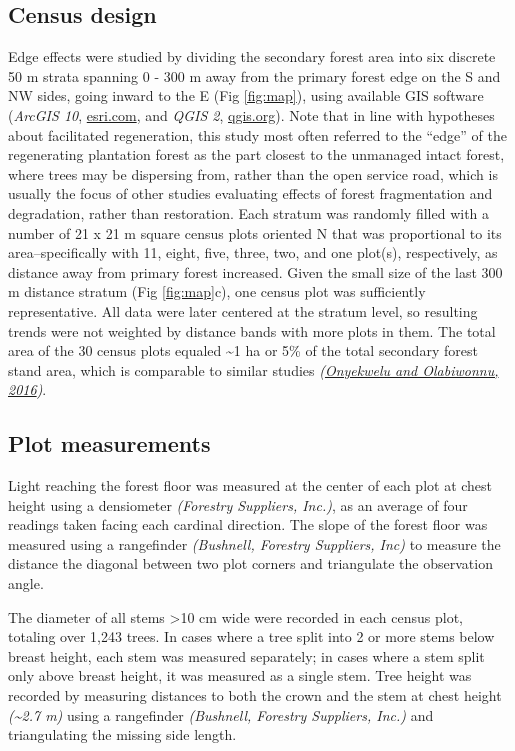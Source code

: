 \documentclass[
  12pt,
]{article}
\begin{document}
\hypertarget{census-design}{%
\subsection{Census design}\label{census-design}}

Edge effects were studied by dividing the secondary forest area into six discrete 50 m strata spanning 0 - 300 m away from the primary forest edge on the S and NW sides, going inward to the E (Fig \ref{fig:map}), using available GIS software (\emph{ArcGIS 10}, \url{esri.com}, and \emph{QGIS 2}, \url{qgis.org}).
Note that in line with hypotheses about facilitated regeneration, this study most often referred to the ``edge'' of the regenerating plantation forest as the part closest to the unmanaged intact forest, where trees may be dispersing from, rather than the open service road, which is usually the focus of other studies evaluating effects of forest fragmentation and degradation, rather than restoration.
Each stratum was randomly filled with a number of 21 x 21 m square census plots oriented N that was proportional to its area--specifically with 11, eight, five, three, two, and one plot(s), respectively, as distance away from primary forest increased.
Given the small size of the last 300 m distance stratum (Fig \ref{fig:map}c), one census plot was sufficiently representative.
All data were later centered at the stratum level, so resulting trends were not weighted by distance bands with more plots in them.
The total area of the 30 census plots equaled \textasciitilde1 ha or 5\% of the total secondary forest stand area, which is comparable to similar studies \emph{(\protect\hyperlink{ref-onyekwelu16}{Onyekwelu and Olabiwonnu, 2016})}.

\hypertarget{plot-measurements}{%
\subsection{Plot measurements}\label{plot-measurements}}

Light reaching the forest floor was measured at the center of each plot at chest height using a densiometer \emph{(Forestry Suppliers, Inc.)}, as an average of four readings taken facing each cardinal direction.
The slope of the forest floor was measured using a rangefinder \emph{(Bushnell, Forestry Suppliers, Inc)} to measure the distance the diagonal between two plot corners and triangulate the observation angle.

The diameter of all stems \textgreater10 cm wide were recorded in each census plot, totaling over 1,243 trees.
In cases where a tree split into 2 or more stems below breast height, each stem was measured separately; in cases where a stem split only above breast height, it was measured as a single stem.
Tree height was recorded by measuring distances to both the crown and the stem at chest height \emph{(\textasciitilde2.7 m)} using a rangefinder \emph{(Bushnell, Forestry Suppliers, Inc.)} and triangulating the missing side length.
\end{document}
